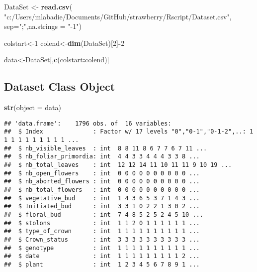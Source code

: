\documentclass[]{article}
\newenvironment{Shaded}{\begin{snugshade}}{\end{snugshade}}
\newcommand{\KeywordTok}[1]{\textcolor[rgb]{0.13,0.29,0.53}{\textbf{#1}}}
\newcommand{\DataTypeTok}[1]{\textcolor[rgb]{0.13,0.29,0.53}{#1}}
\newcommand{\DecValTok}[1]{\textcolor[rgb]{0.00,0.00,0.81}{#1}}
\newcommand{\StringTok}[1]{\textcolor[rgb]{0.31,0.60,0.02}{#1}}
\newcommand{\OperatorTok}[1]{\textcolor[rgb]{0.81,0.36,0.00}{\textbf{#1}}}
\newcommand{\NormalTok}[1]{#1}
\begin{document}
\begin{Shaded}
\begin{Highlighting}[]
\NormalTok{DataSet <-}\StringTok{ }\KeywordTok{read.csv}\NormalTok{(}
  \StringTok{"c:/Users/mlabadie/Documents/GitHub/strawberry/Rscript/Dataset.csv"}\NormalTok{, }
  \DataTypeTok{sep=}\StringTok{";"}\NormalTok{,}\DataTypeTok{na.strings =} \StringTok{"-1"}\NormalTok{)}

\NormalTok{colstart<-}\DecValTok{1}
\NormalTok{colend<-}\KeywordTok{dim}\NormalTok{(DataSet)[}\DecValTok{2}\NormalTok{]}\OperatorTok{-}\DecValTok{2}

\NormalTok{data<-DataSet[,}\KeywordTok{c}\NormalTok{(colstart}\OperatorTok{:}\NormalTok{colend)]}
\end{Highlighting}
\end{Shaded}

\subsection{Dataset Class Object}\label{dataset-class-object}

\begin{Shaded}
\begin{Highlighting}[]
\KeywordTok{str}\NormalTok{(}\DataTypeTok{object =}\NormalTok{ data)}
\end{Highlighting}
\end{Shaded}

\begin{verbatim}
## 'data.frame':    1796 obs. of  16 variables:
##  $ Index              : Factor w/ 17 levels "0","0-1","0-1-2",..: 1 1 1 1 1 1 1 1 1 1 ...
##  $ nb_visible_leaves  : int  8 8 11 8 6 7 7 6 7 11 ...
##  $ nb_foliar_primordia: int  4 4 3 3 4 4 4 3 3 8 ...
##  $ nb_total_leaves    : int  12 12 14 11 10 11 11 9 10 19 ...
##  $ nb_open_flowers    : int  0 0 0 0 0 0 0 0 0 0 ...
##  $ nb_aborted_flowers : int  0 0 0 0 0 0 0 0 0 0 ...
##  $ nb_total_flowers   : int  0 0 0 0 0 0 0 0 0 0 ...
##  $ vegetative_bud     : int  1 4 3 6 5 3 7 1 4 3 ...
##  $ Initiated_bud      : int  3 3 1 0 2 2 1 3 0 2 ...
##  $ floral_bud         : int  7 4 8 5 2 5 2 4 5 10 ...
##  $ stolons            : int  1 1 2 0 1 1 1 1 1 1 ...
##  $ type_of_crown      : int  1 1 1 1 1 1 1 1 1 1 ...
##  $ Crown_status       : int  3 3 3 3 3 3 3 3 3 3 ...
##  $ genotype           : int  1 1 1 1 1 1 1 1 1 1 ...
##  $ date               : int  1 1 1 1 1 1 1 1 1 2 ...
##  $ plant              : int  1 2 3 4 5 6 7 8 9 1 ...
\end{verbatim}
\end{document}
